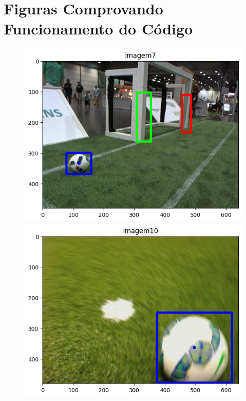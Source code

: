 \documentclass[a4paper,12pt]{article}
\begin{document}
\newpage



\newpage

\section{Figuras Comprovando Funcionamento do Código}

\begin{figure}[htbp]
    \centering
    \begin{minipage}[b]{0.3\textwidth}
        \centering
        \includegraphics[width=\textwidth]{imagem1.png}
        
    \end{minipage}
    \hfill
    \begin{minipage}[b]{0.3\textwidth}
        \centering
        \includegraphics[width=\textwidth]{imagem2.png}
      

\end{minipage}
\end{figure}
\end{document}
